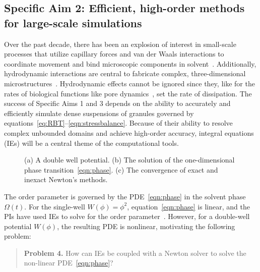 \subsection{Specific Aim 2: Efficient, high-order methods for
large-scale simulations}
\label{sec:specificaim2}
Over the past decade, there has been an explosion of interest in
small-scale processes that utilize capillary forces and van der Waals
interactions to coordinate movement and bind microscopic components in
solvent~\cite{Pandey2011, Zhang2017, Siontorou2017}. Additionally,
hydrodynamic interactions are central to fabricate complex,
three-dimensional microstructures~\cite{Dasgupta2017, Leong2007,
Reynolds2019, Cho2010}. Hydrodynamic effects cannot be ignored since
they, like for the rates of biological functions like pore
dynamics~\cite{RYHAM20112929}, set the rate of dissipation. The success
of Specific Aims 1 and 3 depends on the ability to accurately and
efficiently simulate dense suspensions of granules governed by
equations~\eqref{eq:RBT}--\eqref{eqn:stressbalance}. Because of their
ability to resolve complex unbounded domains and achieve high-order
accuracy, integral equations (IEs) will be a central theme of the
computational tools. 

\begin{figure}
  \vspace{-8pt}
  \centering
   
  \caption{\label{fig:CA} \footnotesize (a) A double well potential. (b)
  The solution of the one-dimensional phase
  transition~\eqref{eqn:phase}. (c) The convergence of exact and inexact
  Newton's methods.}
\end{figure}

The order parameter is governed by the PDE~\eqref{eqn:phase} in the
solvent phase $\Omega(t)$. For the single-well $W(\phi) = \phi^2$,
equation~\eqref{eqn:phase} is linear, and the PIs have used IEs to solve
for the order parameter~\cite{Fu2018_SIAM, FuQuRyYo22,
fu-ryh-qua-you2022}. However, for a double-well potential $W(\phi)$, the
resulting PDE is nonlinear, motivating the following problem:

\begin{quotation}
  \noindent
  \textbf{Problem 4.} How can IEs be coupled with a Newton solver to
  solve the non-linear PDE~\eqref{eqn:phase}?
\end{quotation}

